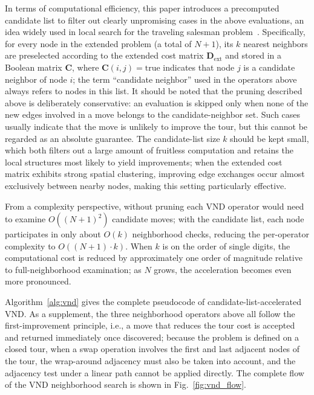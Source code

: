 In terms of computational efficiency, this paper introduces a precomputed candidate list to filter out clearly unpromising cases in the above evaluations, an idea widely used in local search for the traveling salesman problem~\textcolor{blue}{\cite{ref26}}. Specifically, for every node in the extended problem (a total of $N+1$), its $k$ nearest neighbors are preselected according to the extended cost matrix $\mathbf{D}_{\mathrm{ext}}$ and stored in a Boolean matrix $\mathbf{C}$, where $\mathbf{C}(i,j)=\mathrm{true}$ indicates that node $j$ is a candidate neighbor of node $i$; the term ``candidate neighbor'' used in the operators above always refers to nodes in this list. It should be noted that the pruning described above is deliberately conservative: an evaluation is skipped only when none of the new edges involved in a move belongs to the candidate-neighbor set. Such cases usually indicate that the move is unlikely to improve the tour, but this cannot be regarded as an absolute guarantee. The candidate-list size $k$ should be kept small, which both filters out a large amount of fruitless computation and retains the local structures most likely to yield improvements; when the extended cost matrix exhibits strong spatial clustering, improving edge exchanges occur almost exclusively between nearby nodes, making this setting particularly effective.

From a complexity perspective, without pruning each VND operator would need to examine $O((N+1)^2)$ candidate moves; with the candidate list, each node participates in only about $O(k)$ neighborhood checks, reducing the per-operator complexity to $O((N+1)\cdot k)$. When $k$ is on the order of single digits, the computational cost is reduced by approximately one order of magnitude relative to full-neighborhood examination; as $N$ grows, the acceleration becomes even more pronounced.

Algorithm~\textcolor{blue}{\ref{alg:vnd}} gives the complete pseudocode of candidate-list-accelerated VND. As a supplement, the three neighborhood operators above all follow the first-improvement principle, i.e., a move that reduces the tour cost is accepted and returned immediately once discovered; because the problem is defined on a closed tour, when a swap operation involves the first and last adjacent nodes of the tour, the wrap-around adjacency must also be taken into account, and the adjacency test under a linear path cannot be applied directly. The complete flow of the VND neighborhood search is shown in Fig.~\textcolor{blue}{\ref{fig:vnd_flow}}.

